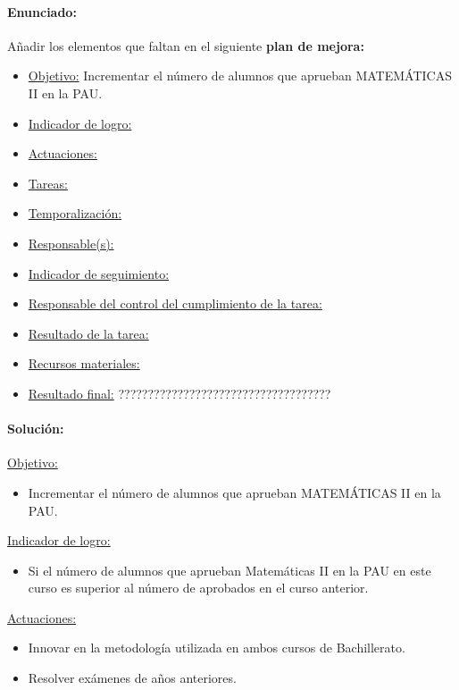 {\paragraph{Enunciado: }

Añadir los elementos que faltan en el siguiente \textbf{plan de mejora:}

\begin{itemize}
\item  \ul{Objetivo:} Incrementar el número de alumnos que aprueban
\subitem MATEMÁTICAS II en la PAU.
\item  \ul{Indicador de logro:}
\item  \ul{Actuaciones:}
\item  \ul{Tareas:}
\item  \ul{Temporalizaci\'on:}
\item  \ul{Responsable(s):}
\item  \ul{Indicador de seguimiento:}
\item  \ul{Responsable del control del cumplimiento de la tarea:}
\item  \ul{Resultado de la tarea:}
\item  \ul{Recursos materiales:}
\item  \ul{Resultado final:} ????????????????????????????????????
\end{itemize}

\paragraph{Solución:}\mbox{}

\ul{Objetivo:}
\begin{itemize}
	\item Incrementar el número de alumnos que aprueban MATEMÁTICAS II en la PAU.
\end{itemize}


\ul{Indicador de logro:}
\begin{itemize}
	\item Si el número de alumnos que aprueban Matemáticas II en la PAU en este curso es superior al número de aprobados en el curso anterior.
\end{itemize}


\ul{Actuaciones:}
\vspace{-0.3cm}
\begin{itemize}
	\item Innovar en la metodología utilizada en ambos cursos de Bachillerato.

	\item Resolver exámenes de años anteriores.


\end{itemize}}

